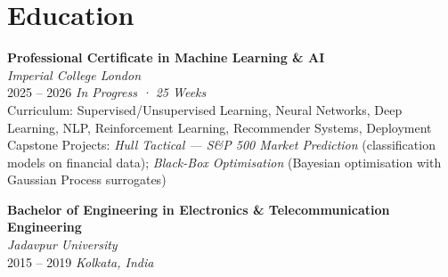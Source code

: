 \documentclass[a4paper,10pt]{article}
\newlength{\leftcolwidth}
\begin{document}
\begin{minipage}[t]{\leftcolwidth}
\section*{Education}
\textbf{Professional Certificate in Machine Learning \& AI}\\
\textit{Imperial College London} \\
2025 -- 2026 \quad \textit{In Progress · 25 Weeks}\\[0.3em]
\small Curriculum: Supervised/Unsupervised Learning, Neural Networks, Deep Learning, NLP, Reinforcement Learning, Recommender Systems, Deployment\\[0.2em]
Capstone Projects: \textit{Hull Tactical — S\&P 500 Market Prediction} (classification models on financial data); \textit{Black-Box Optimisation} (Bayesian optimisation with Gaussian Process surrogates)\\
\normalsize

\vspace{0.5em}
\textbf{Bachelor of Engineering in Electronics \& Telecommunication Engineering}\\
\textit{Jadavpur University} \\
2015 -- 2019 \quad \textit{Kolkata, India}

\end{minipage}%
\hfill%
\end{document}
